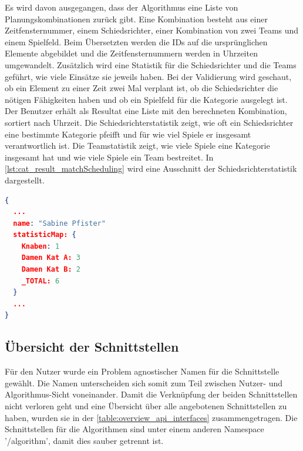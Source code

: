 Es wird davon ausgegangen, dass der Algorithmus eine Liste von Planungskombinationen zurück gibt. Eine Kombination besteht aus einer Zeitfensternummer, einem Schiedsrichter, 
einer Kombination von zwei Teams und einem Spielfeld. Beim Übersetzten werden die IDs auf die ursprünglichen Elemente abgebildet und die Zeitfensternummern werden in Uhrzeiten 
umgewandelt. Zusätzlich wird eine Statistik für die Schiedsrichter und die Teams geführt, wie viele Einsätze sie jeweils haben. Bei der Validierung wird geschaut, ob ein Element zu einer Zeit zwei 
Mal verplant ist, ob die Schiedsrichter die nötigen Fähigkeiten haben und ob ein Spielfeld für die Kategorie ausgelegt ist. Der Benutzer erhält als Resultat eine Liste mit den berechneten 
Kombination, sortiert nach Uhrzeit. Die Schiedsrichterstatistik zeigt, wie oft ein Schiedsrichter eine bestimmte Kategorie pfeifft und für wie viel Spiele er insgesamt verantwortlich ist. Die 
Teamstatistik zeigt, wie viele Spiele eine Kategorie insgesamt hat und wie viele Spiele ein Team bestreitet. In \autoref{lst:cat_result_matchScheduling} wird eine Ausschnitt der 
Schiedsrichterstatistik dargestellt.

\begin{lstlisting}[language=JSON, caption=Ausschnitt eines Resultats einer Spielplan Erstellung, label=lst:cat_result_matchScheduling]  
{
  ...
  name: "Sabine Pfister"
  statisticMap: {
    Knaben: 1
    Damen Kat A: 3
    Damen Kat B: 2
    _TOTAL: 6
  }
  ...
}
\end{lstlisting}

\subsection{Übersicht der Schnittstellen}
Für den Nutzer wurde ein Problem agnostischer Namen für die Schnittstelle gewählt. Die Namen unterscheiden sich somit zum Teil zwischen Nutzer- und Algorithmus-Sicht voneinander. Damit die 
Verknüpfung der beiden Schnittstellen nicht verloren geht und eine Übersicht über alle angebotenen Schnittstellen zu haben, wurden sie in der \autoref{table:overview_api_interfaces} 
zusammengetragen. Die Schnittstellen für die Algorithmen sind unter einem anderen Namespace '/algorithm', damit dies sauber getrennt ist.

